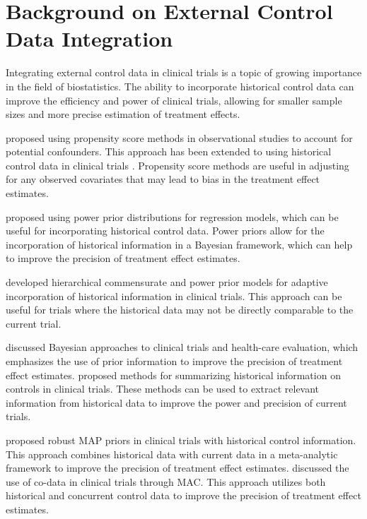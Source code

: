 \section{Background on External Control Data Integration}
Integrating external control data in clinical trials is a topic of growing importance in the field of biostatistics. The ability to incorporate historical control data can improve the efficiency and power of clinical trials, allowing for smaller sample sizes and more precise estimation of treatment effects.

\cite{rosenbaum1983central} proposed using propensity score methods in observational studies to account for potential confounders. This approach has been extended to using historical control data in clinical trials \citep{viele2014use, pocock1976combination}. Propensity score methods are useful in adjusting for any observed covariates that may lead to bias in the treatment effect estimates.

\cite{ibrahim2000power} proposed using power prior distributions for regression models, which can be useful for incorporating historical control data. Power priors allow for the incorporation of historical information in a Bayesian framework, which can help to improve the precision of treatment effect estimates.

\cite{hobbs2011hierarchical} developed hierarchical commensurate and power prior models for adaptive incorporation of historical information in clinical trials. This approach can be useful for trials where the historical data may not be directly comparable to the current trial.

\cite{spiegelhalter2004bayesian} discussed Bayesian approaches to clinical trials and health-care evaluation, which emphasizes the use of prior information to improve the precision of treatment effect estimates. \cite{neuenschwander2010summarizing} proposed methods for summarizing historical information on controls in clinical trials. These methods can be used to extract relevant information from historical data to improve the power and precision of current trials.

\cite{schmidli2014robust} proposed robust \ac{MAP} priors in clinical trials with historical control information. This approach combines historical data with current data in a meta-analytic framework to improve the precision of treatment effect estimates. \cite{neuenschwander2016use} discussed the use of co-data in clinical trials through \ac{MAC}. This approach utilizes both historical and concurrent control data to improve the precision of treatment effect estimates.

